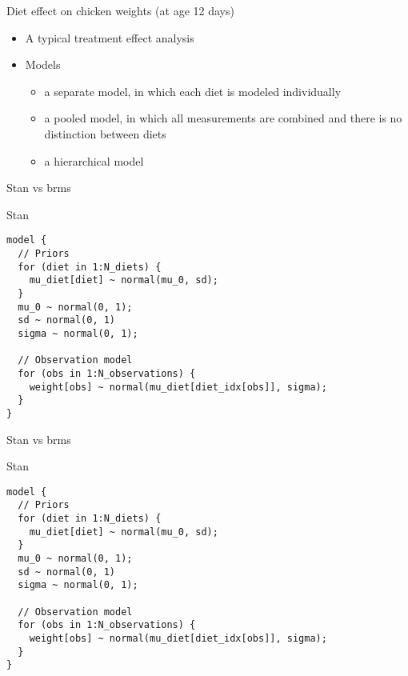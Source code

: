 \documentclass[finnish,english,t]{beamer}
\begin{document}
\begin{frame}{Diet effect on chicken weights (at age 12 days)}

  \begin{itemize}
  \item A typical treatment effect analysis
  \item Models
    \begin{itemize}
    \item a separate model, in which each diet is modeled individually
    \item a pooled model, in which all measurements are combined and there is no distinction between diets
    \item a hierarchical model
    \end{itemize}
  \end{itemize}
  
\end{frame}

\begin{frame}[fragile]{Stan vs brms}

  \vspace{-0.5\baselineskip}

  Stan
  
{\small
\begin{verbatim}
model {
  // Priors
  for (diet in 1:N_diets) {
    mu_diet[diet] ~ normal(mu_0, sd);
  }
  mu_0 ~ normal(0, 1);
  sd ~ normal(0, 1)
  sigma ~ normal(0, 1);
  
  // Observation model
  for (obs in 1:N_observations) {
    weight[obs] ~ normal(mu_diet[diet_idx[obs]], sigma);
  }
}
\end{verbatim}
}
\end{frame}

\begin{frame}[fragile]{Stan vs brms}

  \vspace{-0.5\baselineskip}

  Stan
  
{\small
\begin{verbatim}
model {
  // Priors
  for (diet in 1:N_diets) {
    mu_diet[diet] ~ normal(mu_0, sd);
  }
  mu_0 ~ normal(0, 1);
  sd ~ normal(0, 1)
  sigma ~ normal(0, 1);
  
  // Observation model
  for (obs in 1:N_observations) {
    weight[obs] ~ normal(mu_diet[diet_idx[obs]], sigma);
  }
}
\end{verbatim}
}
\end{frame}
\end{document}
